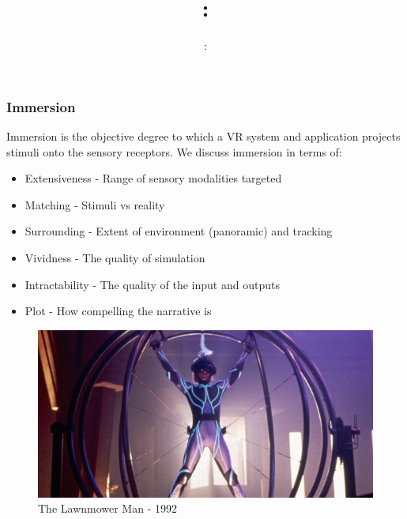 \usepackage{../../beamerthemeFalmouthGamesAcademy}
\usepackage{multimedia}
\graphicspath{ {../../} }


\usepackage[normalem]{ulem}
\usepackage{wasysym}
\usepackage{gensymb}
\usepackage{pdfpages}

\usetikzlibrary{arrows,automata}




\title{\sessionnumber: }
\subtitle{\modulecode: \moduletitle }

\frame{\titlepage} 


\begin{frame}
	\frametitle{Immersion}
	Immersion is the objective degree to which a VR system and application projects stimuli onto the sensory receptors. We discuss immersion in terms of:

	\begin{itemize}
		\item Extensiveness - Range of sensory modalities targeted 
		\item Matching - Stimuli vs reality
		\item Surrounding - Extent of environment (panoramic) and tracking
		\item Vividness - The quality of simulation
		\item Intractability - The quality of the input and outputs
		\item Plot - How compelling the narrative is
	\end{itemize}
\end{frame}

\begin{frame}
	\begin{figure}
		\includegraphics[scale=.6]{assets/mower} 
		\caption{The Lawnmower Man - 1992}
	\end{figure}
\end{frame}



